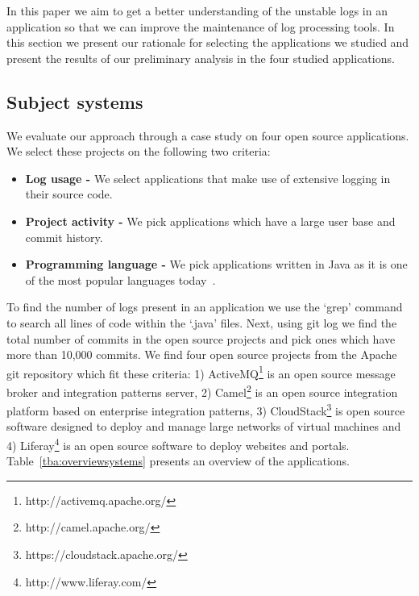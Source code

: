 In this paper we aim to get a better understanding of the
unstable logs in an application so that we can improve the maintenance of log processing tools. In this section we present our rationale for selecting the applications we studied and present the results of our preliminary analysis in the four studied applications.

\subsection{Subject systems}
We evaluate our approach through a case study on four open source applications. We select these projects on the following two criteria:
\begin{itemize}
	\item \textbf{Log usage -} We select applications that make use of extensive logging in their source code. 
	\item \textbf{Project activity -} We pick applications which have a large user base and commit history.
	\item \textbf{Programming language -} We pick applications written in Java as it is one of the most popular languages today~\cite{Javaprog}.
\end{itemize}




To find the number of logs present in an application we use the `grep' command to search all lines of code within the `.java' files. Next, using git log we find the total number of commits in the open source projects and pick ones which have more than 10,000 commits. We find four open source projects from the Apache git repository which fit these criteria: 1) ActiveMQ\footnote[1]{http://activemq.apache.org/} is an open source message broker and integration patterns server, 2) {Camel}\footnote[2]{http://camel.apache.org/} is an open source integration platform based on enterprise integration patterns, 3) {CloudStack}\footnote[3]{https://cloudstack.apache.org/} is open source software designed to deploy and manage large networks of virtual machines and 4) {Liferay}\footnote[4]{http://www.liferay.com/} is an open source software to deploy websites and portals. Table~\ref{tba:overviewsystems} presents an overview of the applications. 


